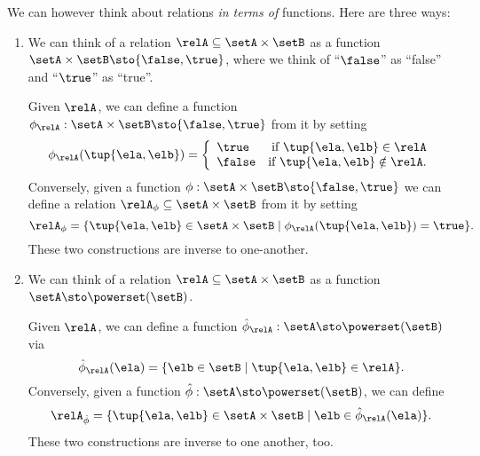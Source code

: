 \begin{remark}
    \label{re:rel-three-fun-descriptions}
    We can however think about relations \emph{in terms of} functions. Here are three ways:
    \begin{enumerate}
        \item We can think of a relation $\relA \subseteq \setA \times \setB$ as a function $\setA \times \setB \sto \{ \false, \true \}$, where we think of ``$\false$'' as ``false'' and ``$\true$'' as ``true''.

        Given $\relA$, we can define a function $\phi_{\relA} : \setA \times \setB \sto \{ \false, \true \}$ from it by setting
        \begin{equation}
            \phi_{\relA}(\tup{\ela, \elb}) =
            \left
            \{\begin{array}{lr}
                  \true  & \text{if } \tup{\ela, \elb} \in \relA     \\
                  \false & \text{if } \tup{\ela, \elb} \notin \relA.
            \end{array}
            \right.
        \end{equation}
        Conversely, given a function $\phi: \setA \times \setB \sto \{ \false, \true \}$ we can define a relation $\relA_{\phi} \subseteq \setA \times \setB$ from it by setting
        \begin{equation}
            \relA_{\phi} = \{ \tup{\ela, \elb} \in \setA \times \setB \mid \phi_{\relA}(\tup{\ela, \elb}) = \true \}.
        \end{equation}
        These two constructions are inverse to one-another.

        \item We can think of a relation $\relA \subseteq \setA \times \setB$ as a function $\setA  \sto \powerset (\setB)$.

        Given $\relA$, we can define a function $\hat \phi_{\relA} : \setA \sto \powerset (\setB)$ via
        \begin{equation}
            \hat \phi_{\relA} (\ela) = \{ \elb \in \setB \mid \tup{\ela, \elb} \in \relA \}.
        \end{equation}
        Conversely, given a function $\hat \phi : \setA \sto \powerset (\setB)$, we can define
        \begin{equation}
            \relA_{\hat \phi} = \{ \tup{\ela, \elb} \in \setA \times \setB \mid \elb \in \hat \phi_{\relA}(\ela)   \}.
        \end{equation}
        These two constructions are inverse to one another, too.


\end{enumerate}
\end{remark}
